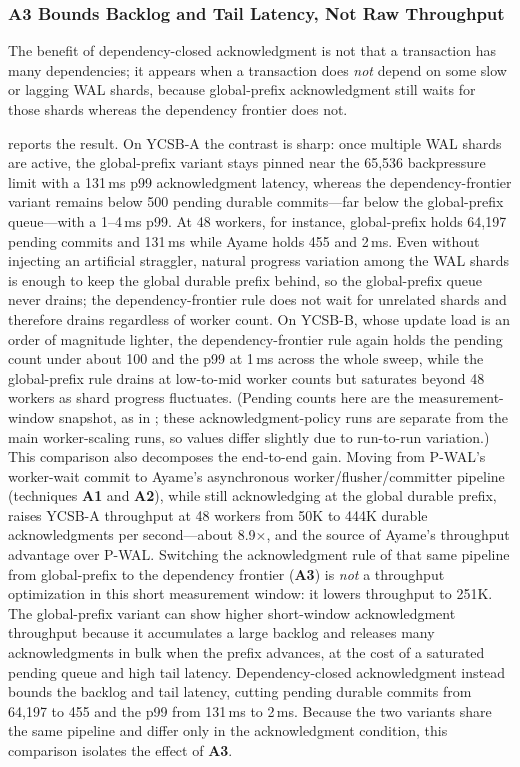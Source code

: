 \subsubsection{A3 Bounds Backlog and Tail Latency, Not Raw Throughput}

The benefit of dependency-closed acknowledgment is not that a transaction has
many dependencies; it appears when a transaction does \emph{not} depend on some
slow or lagging WAL shards, because global-prefix acknowledgment still waits for
those shards whereas the dependency frontier does not.

reports the result.
On YCSB-A the contrast is sharp: once multiple WAL shards are active, the
global-prefix variant stays pinned near the 65{,}536 backpressure limit with a
131\,ms p99 acknowledgment latency, whereas the dependency-frontier variant
remains below 500 pending durable commits---far below the global-prefix
queue---with a 1--4\,ms p99.  At 48 workers, for
instance, global-prefix holds 64{,}197 pending commits and 131\,ms while
Ayame holds 455 and 2\,ms.  Even without injecting an artificial straggler,
natural progress variation among the WAL shards is enough to keep the
global durable prefix behind, so the global-prefix queue never drains; the
dependency-frontier rule does not wait for unrelated shards and therefore
drains regardless of worker count.  On YCSB-B, whose update load is an
order of magnitude lighter, the dependency-frontier rule again holds the
pending count under about 100 and the p99 at 1\,ms across the whole sweep,
while the global-prefix rule drains at low-to-mid worker counts but
saturates beyond 48 workers as shard progress fluctuates.  (Pending counts
here are the measurement-window snapshot, as in
; these acknowledgment-policy
runs are separate from the main worker-scaling runs, so values differ
slightly due to run-to-run variation.)  This comparison also decomposes the end-to-end gain.  Moving from P-WAL's
worker-wait commit to Ayame's asynchronous worker/flusher/committer pipeline
(techniques \textbf{A1} and \textbf{A2}), while still acknowledging at the
global durable prefix, raises YCSB-A throughput at 48 workers from 50K to 444K
durable acknowledgments per second---about 8.9$\times$, and the source of
Ayame's throughput advantage over P-WAL.  Switching the acknowledgment rule of
that same pipeline from global-prefix to the dependency frontier (\textbf{A3})
is \emph{not} a throughput optimization in this short measurement window: it
lowers throughput to 251K.  The global-prefix variant can show higher
short-window acknowledgment throughput because it accumulates a large backlog
and releases many acknowledgments in bulk when the prefix advances, at the cost
of a saturated pending queue and high tail latency.  Dependency-closed
acknowledgment instead bounds the backlog and tail latency, cutting pending
durable commits from 64{,}197 to 455 and the p99 from 131\,ms to 2\,ms.  Because the two variants share the same pipeline and differ only in
the acknowledgment condition, this comparison isolates the effect of
\textbf{A3}.


